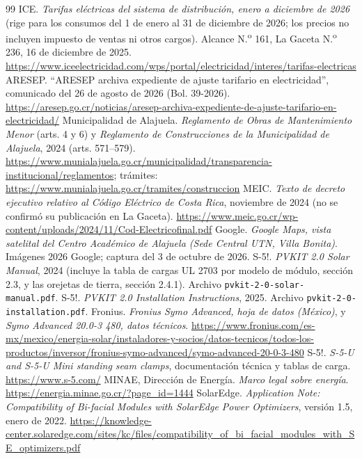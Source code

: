 \documentclass[12pt]{article}
\begin{document}
\begin{thebibliography}{99}
 ICE. \emph{Tarifas eléctricas del sistema de distribución, enero a diciembre de 2026} (rige para los consumos del 1 de enero al 31 de diciembre de 2026; los precios no incluyen impuesto de ventas ni otros cargos). Alcance N.\textsuperscript{o} 161, La Gaceta N.\textsuperscript{o} 236, 16 de diciembre de 2025. \url{https://www.iceelectricidad.com/wps/portal/electricidad/interes/tarifas-electricas}
 ARESEP. ``ARESEP archiva expediente de ajuste tarifario en electricidad'', comunicado del 26 de agosto de 2026 (Bol. 39-2026). \url{https://aresep.go.cr/noticias/aresep-archiva-expediente-de-ajuste-tarifario-en-electricidad/}
 Municipalidad de Alajuela. \emph{Reglamento de Obras de Mantenimiento Menor} (arts. 4 y 6) y \emph{Reglamento de Construcciones de la Municipalidad de Alajuela}, 2024 (arts. 571--579). \url{https://www.munialajuela.go.cr/municipalidad/transparencia-institucional/reglamentos}; trámites: \url{https://www.munialajuela.go.cr/tramites/construccion}
 MEIC. \emph{Texto de decreto ejecutivo relativo al Código Eléctrico de Costa Rica}, noviembre de 2024 (no se confirmó su publicación en La Gaceta). \url{https://www.meic.go.cr/wp-content/uploads/2024/11/Cod-Electricofinal.pdf}
 Google. \emph{Google Maps, vista satelital del Centro Académico de Alajuela (Sede Central UTN, Villa Bonita)}. Imágenes \textcopyright{} 2026 Google; captura del 3 de octubre de 2026.
 S-5!. \emph{PVKIT 2.0 Solar Manual}, 2024 (incluye la tabla de cargas UL 2703 por modelo de módulo, sección 2.3, y las orejetas de tierra, sección 2.4.1). Archivo \texttt{pvkit-2-0-solar-manual.pdf}.
 S-5!. \emph{PVKIT 2.0 Installation Instructions}, 2025. Archivo \texttt{pvkit-2-0-installation.pdf}.
 Fronius. \emph{Fronius Symo Advanced, hoja de datos (México)}, y \emph{Symo Advanced 20.0-3 480, datos técnicos}. \url{https://www.fronius.com/es-mx/mexico/energia-solar/instaladores-y-socios/datos-tecnicos/todos-los-productos/inversor/fronius-symo-advanced/symo-advanced-20-0-3-480}
 S-5!. \emph{S-5-U and S-5-U Mini standing seam clamps}, documentación técnica y tablas de carga. \url{https://www.s-5.com/}
 MINAE, Dirección de Energía. \emph{Marco legal sobre energía}. \url{https://energia.minae.go.cr/?page_id=1444}
 SolarEdge. \emph{Application Note: Compatibility of Bi-facial Modules with SolarEdge Power Optimizers}, versión 1.5, enero de 2022. \url{https://knowledge-center.solaredge.com/sites/kc/files/compatibility_of_bi_facial_modules_with_SE_optimizers.pdf}

\end{thebibliography}
\end{document}
